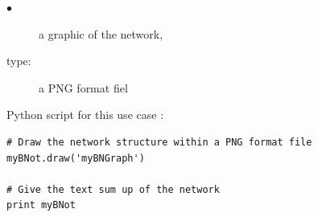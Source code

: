 {
  \begin{description}
  \item[$\bullet$] a graphic of the network, 
  \item[type:] a PNG format fiel
  \end{description}
}

\espace 

Python  script for this use case :

\begin{lstlisting}
# Draw the network structure within a PNG format file
myBNot.draw('myBNGraph')

# Give the text sum up of the network
print myBNot
\end{lstlisting}